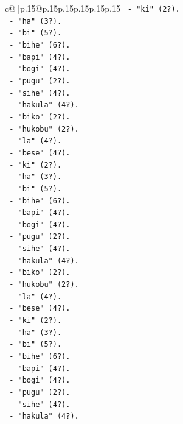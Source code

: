 \documentclass{article}
\begin{document}
{\begin{supertabular}{c@{$\;$}|p{.15\linewidth}@{}p{.15\linewidth}p{.15\linewidth}p{.15\linewidth}p{.15\linewidth}p{.15\linewidth}}
{{{\texttt{       {-} "ki" (2?).} \\
\texttt{       {-} "ha" (3?).} \\
\texttt{       {-} "bi" (5?).} \\
\texttt{       {-} "bihe" (6?).} \\
\texttt{       {-} "bapi" (4?).} \\
\texttt{       {-} "bogi" (4?).} \\
\texttt{       {-} "pugu" (2?).} \\
\texttt{       {-} "sihe" (4?).} \\
\texttt{       {-} "hakula" (4?).} \\
\texttt{       {-} "biko" (2?).} \\
\texttt{       {-} "hukobu" (2?).} \\
\texttt{       {-} "la" (4?).} \\
\texttt{       {-} "bese" (4?).} \\
\texttt{       {-} "ki" (2?).} \\
\texttt{       {-} "ha" (3?).} \\
\texttt{       {-} "bi" (5?).} \\
\texttt{       {-} "bihe" (6?).} \\
\texttt{       {-} "bapi" (4?).} \\
\texttt{       {-} "bogi" (4?).} \\
\texttt{       {-} "pugu" (2?).} \\
\texttt{       {-} "sihe" (4?).} \\
\texttt{       {-} "hakula" (4?).} \\
\texttt{       {-} "biko" (2?).} \\
\texttt{       {-} "hukobu" (2?).} \\
\texttt{       {-} "la" (4?).} \\
\texttt{       {-} "bese" (4?).} \\
\texttt{       {-} "ki" (2?).} \\
\texttt{       {-} "ha" (3?).} \\
\texttt{       {-} "bi" (5?).} \\
\texttt{       {-} "bihe" (6?).} \\
\texttt{       {-} "bapi" (4?).} \\
\texttt{       {-} "bogi" (4?).} \\
\texttt{       {-} "pugu" (2?).} \\
\texttt{       {-} "sihe" (4?).} \\
\texttt{       {-} "hakula" (4?).} \\
}}}
\end{supertabular}}
\end{document}
